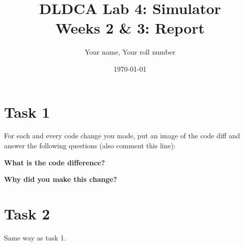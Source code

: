 \documentclass[11pt]{article}
\title{DLDCA Lab 4: Simulator\\Weeks 2 \& 3: Report}
\author{Your name, Your roll number}
\date{\today}
\begin{document}
\maketitle

\section{Task 1}
For each and every code change you made, put an image of the code diff and answer the following questions (also comment this line):

\textbf{What is the code difference?}

\textbf{Why did you make this change?}

\section{Task 2}
Same way as task 1.
\end{document}

